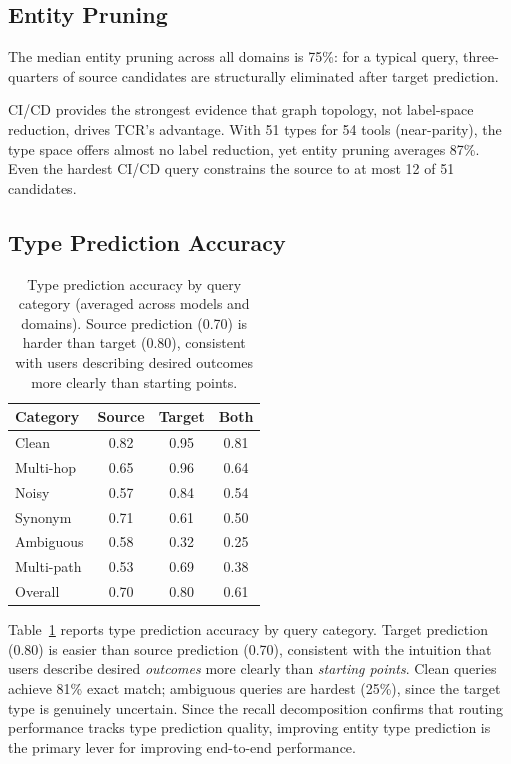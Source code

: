 \subsection{Entity Pruning}
\label{sec:entity-pruning}

The median entity pruning across all domains is 75\%: for a typical query, three-quarters of source candidates are structurally eliminated after target prediction.

CI/CD provides the strongest evidence that graph topology, not label-space reduction, drives TCR's advantage.
With 51 types for 54 tools (near-parity), the type space offers almost no label reduction, yet entity pruning averages 87\%.
Even the hardest CI/CD query constrains the source to at most 12 of 51 candidates.

\subsection{Type Prediction Accuracy}
\label{sec:type-prediction}

\begin{table}[t]
\centering
\small
\begin{tabular}{l ccc}
\toprule
\textbf{Category} & \textbf{Source} & \textbf{Target} & \textbf{Both} \\
\midrule
Clean & 0.82 & 0.95 & 0.81 \\
Multi-hop & 0.65 & 0.96 & 0.64 \\
Noisy & 0.57 & 0.84 & 0.54 \\
Synonym & 0.71 & 0.61 & 0.50 \\
Ambiguous & 0.58 & 0.32 & 0.25 \\
Multi-path & 0.53 & 0.69 & 0.38 \\
\midrule
Overall & 0.70 & 0.80 & 0.61 \\
\bottomrule
\end{tabular}
\caption{Type prediction accuracy by query category (averaged across models and domains). Source prediction (0.70) is harder than target (0.80), consistent with users describing desired outcomes more clearly than starting points.}
\label{tab:type-prediction}
\end{table}

Table~\ref{tab:type-prediction} reports type prediction accuracy by query category.
Target prediction (0.80) is easier than source prediction (0.70), consistent with the intuition that users describe desired \emph{outcomes} more clearly than \emph{starting points}.
Clean queries achieve 81\% exact match; ambiguous queries are hardest (25\%), since the target type is genuinely uncertain.
Since the recall decomposition confirms that routing performance tracks type prediction quality, improving entity type prediction is the primary lever for improving end-to-end performance.


